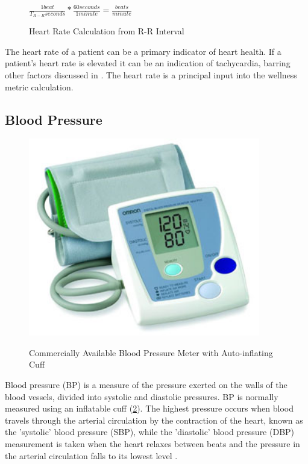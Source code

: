 \begin{figure}
	\begin{center}
		\label{fig:RR_PulseRateCalc}
		$\frac{1 beat}{T_{R-R} seconds}*\frac{60 seconds}{1 minute}=\frac{beats}{minute}$
		\caption{Heart Rate Calculation from R-R Interval}
	\end{center}
\end{figure}

The heart rate of a patient can be a primary indicator of heart health. If a patient's heart rate is elevated it can be an indication of tachycardia, barring other factors discussed in . The heart rate is a principal input into the wellness metric calculation.

\subsection{Blood Pressure}
\label{subsec:BloodPressure}
\begin{figure}
	\begin{center}
		\label{fig:BP_cuff}
		\includegraphics[scale=1,width=0.9\textwidth]{Images/BPCuff.png} 
		\caption{Commercially Available Blood Pressure Meter with Auto-inflating Cuff}
	\end{center}
\end{figure}

Blood pressure (BP) is a measure of the pressure exerted on the walls of the blood vessels, divided into systolic and diastolic pressures. BP is normally measured using an inflatable cuff (\cref{fig:BP_cuff}). The highest pressure occurs when blood travels through the arterial circulation by the contraction of the heart,  known as the 'systolic' blood pressure (SBP), while the 'diastolic' blood pressure (DBP) measurement is taken when the heart relaxes between beats and the pressure in the arterial circulation falls to its lowest level \cite{NOORDIN2009}. 

